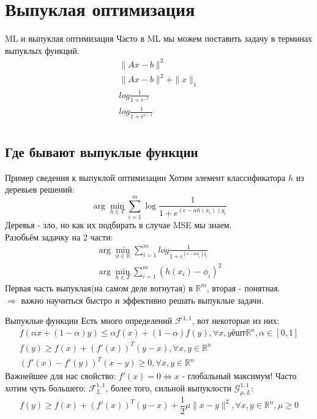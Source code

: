 \documentclass[14pt, fleqn, xcolor={dvipsnames, table}]{beamer}
\begin{document}
\section{Выпуклая оптимизация}

\begin{frame}{ML и выпуклая оптимизация}
Часто в ML мы можем поставить задачу в терминах выпуклых функций.
$$\begin{array}{l}
  \|Ax - b\|^2 \\
  \|Ax - b\|^2 + \|x\|_1 \\
  log\frac{1}{1+e^{-t}} \\
  log\frac{1}{1+e^{c-t}} \\
\end{array}$$
\end{frame}

\subsection{Где бывают выпуклые функции}

\begin{frame}{Пример сведения к выпуклой оптимизации}
\small
Хотим элемент классификатора $h$ из деревьев решений:
$$
\arg\min_{h \in T}\sum_{i=1}^m \log\frac{1}{1+e^{(c - \alpha h(x_i))y_i}}
$$
Деревья - зло, но как их подбирать в случае MSE мы знаем. \\
Разобьём задачку на 2 части:
$$\begin{array}{l}
  \arg\min_{\phi \in \mathbb{R}}\sum_{i=1}^mlog\frac{1}{1+e^{(c - \alpha \phi_i)y_i}} \\
  \arg\min_{h \in T}\sum_{i=1}^m(h(x_i) - \phi_i)^2
\end{array}$$
Первая часть выпуклая(на самом деле вогнутая) в $\mathbb{R}^m$, вторая - понятная. \\
$\Rightarrow$ важно научиться быстро и эффективно решать выпуклые задачи.
\end{frame}

\begin{frame}{Выпуклые функции}
\small
Есть много определений $\mathcal{F}^{1,1}$, вот некоторые из них:
$$\begin{array}{l}
  f(\alpha x + (1- \alpha)y) \le \alpha f(x) + (1-\alpha)f(y), \forall x,y ёшт \mathbb{R}^n, \alpha \in [0,1] \\
  f(y) \ge f(x) + (f'(x))^T(y-x), \forall x,y \in \mathbb{R}^n \\
  (f'(x) - f'(y))^T(x-y) \ge 0, \forall x,y \in \mathbb{R}^n 
\end{array}$$
Важнейшее для нас свойство: $f'(x) = 0 \Leftrightarrow x$ - глобальный максимум! Часто хотим чуть большего: $\mathcal{F}_L^{1,1}$, более того, сильной выпуклости $\mathcal{G}_{\mu, L}^{1,1}$:  \\
$$
f(y) \ge f(x) + (f'(x))^T(y-x) + \frac{1}{2}\mu\|x-y\|^2, \forall x,y \in \mathbb{R}^n, \mu \ge 0 
$$
\end{frame}
\end{document}
